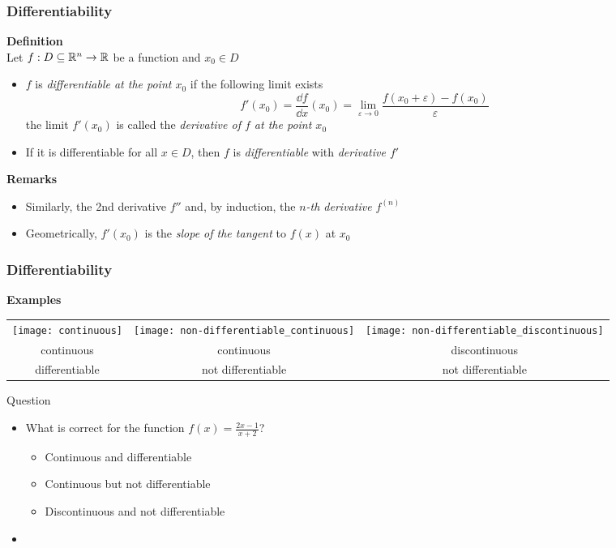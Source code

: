 \documentclass[%
  final,
  11pt, 
  show notes, %
  t, %
  fleqn, %
]{beamer}
\begin{document}
\begin{frame}
  \frametitle{Differentiability}
\textbf{Definition}\\
Let $f : D \subseteq \mathbb{R}^n \rightarrow \mathbb{R}$ be a function and $x_0 \in D$
\begin{itemize}
\item $f$ is \emph{differentiable at the point $x_0$} if the following limit exists
\begin{equation*}
f'(x_0) = \frac{\dd f}{\dd x}(x_0) = \lim_{\varepsilon \to 0}\frac{f(x_0 + \varepsilon) - f(x_0)}{\varepsilon}
\end{equation*}
the limit $f'(x_0)$ is called the \emph{derivative of $f$ at the point $x_0$}
\item If it is differentiable for all $x \in D$, then $f$ is \emph{differentiable} with \emph{derivative $f'$}
\end{itemize}

\vspace*{0.4cm}
\textbf{Remarks}
\begin{itemize}
\item Similarly, the 2nd derivative $f''$ and, by induction, the \emph{$n$-th derivative $f^{(n)}$}
\item Geometrically, $f'(x_0)$ is the \emph{slope of the tangent} to $f(x)$ at $x_0$
\end{itemize}
\end{frame}

\begin{frame}
  \frametitle{Differentiability}
\textbf{Examples}\\
\begin{tabular}{ccc}
\texttt{[image: continuous]} & \texttt{[image: non-differentiable\_continuous]} & \texttt{[image: non-differentiable\_discontinuous]} \\
continuous & continuous & discontinuous \\
differentiable & not differentiable & not differentiable
\end{tabular}

\begin{exampleblock}{Question}
\begin{itemize}
\item What is correct for the function $f(x) = \frac{2x-1}{x+2}$?
\begin{itemize}
\item Continuous and differentiable
\item Continuous but not differentiable
\item Discontinuous and not differentiable
\end{itemize}
\item \CourseQuiz
\end{itemize}
\end{exampleblock}
\end{frame}
\end{document}
